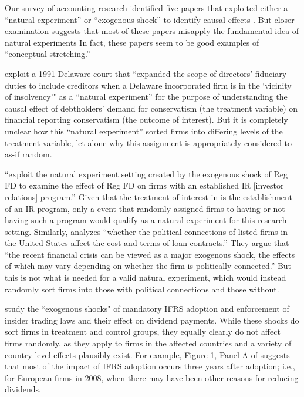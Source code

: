 \documentclass[11pt,reqno]{amsart}
\begin{document}
\begin{doublespace}
Our survey of accounting research identified five papers that exploited either a ``natural experiment'' or ``exogenous shock'' to identify causal effects \citep{Lo:2013jk,Aier:2014ii,Kirk:2014gx,Houston:2014hv,Hail:2014fq}.
But closer examination suggests that most of these papers misapply the fundamental idea of natural experiments  In fact, these papers seem to be good examples of ``conceptual stretching.''

\cite{Aier:2014ii} exploit a 1991 Delaware court that ``expanded the scope of directors' fiduciary duties to include creditors when a Delaware incorporated firm is in the `vicinity of insolvency'" as a ``natural experiment'' for the purpose of understanding the causal effect of debtholders' demand for conservatism (the treatment variable) on financial reporting conservatism (the outcome of interest).
But it is completely unclear how this ``natural experiment'' sorted firms into differing levels of the treatment variable, let alone why this assignment is appropriately considered to as-if random.

\citet{Kirk:2014gx} ``exploit the natural experiment setting created by the exogenous shock of Reg FD to examine the effect of Reg FD on firms with an established IR [investor relations] program.'' 
Given that the treatment of interest in \citet{Kirk:2014gx} is the establishment of an IR program, only a event that randomly assigned firms to having or not having such a program would qualify as a natural experiment for this research setting. Similarly, \citet{Houston:2014hv} analyzes ``whether the political connections of listed firms in the United States affect the cost and terms of loan contracts.'' They argue that ``the recent financial crisis can be viewed as a major exogenous shock, the effects of which may vary depending on whether the firm is politically connected.'' 
But this is not what is needed for a valid natural experiment, which would instead randomly sort firms into those with political connections and those without. 

\citet{Hail:2014fq} study the ``exogenous shocks" of mandatory IFRS adoption and enforcement of insider trading laws and their effect on dividend payments.
While these shocks do sort firms in treatment and control groups, they equally clearly do not affect firms randomly, as they apply to firms in the affected countries and a variety of country-level effects plausibly exist. 
For example,  Figure 1, Panel A of \citet{Hail:2014fq} suggests that most of the impact of IFRS adoption occurs three years after adoption; i.e., for European firms in 2008, when there may have been other reasons for reducing dividends.


\end{doublespace}
\end{document}
